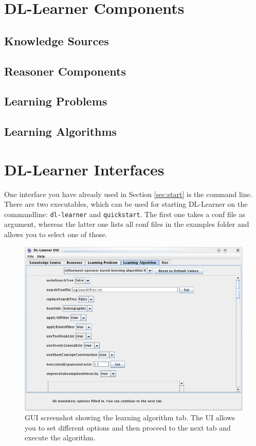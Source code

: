 \documentclass[a4paper,12pt]{scrartcl}
\begin{document}
\section{DL-Learner Components}
\label{sec:components}



\subsection{Knowledge Sources}

\subsection{Reasoner Components}

\subsection{Learning Problems}

\subsection{Learning Algorithms}



\section{DL-Learner Interfaces}

One interface you have already used in Section \ref{sec:start} is the command line. There are two executables, which can be used for starting DL-Learner on the commandline: \verb|dl-learner| and \verb|quickstart|. The first one takes a conf file as argument, whereas the latter one lists all conf files in the examples folder and allows you to select one of those.

\begin{figure}
 \centering
 \includegraphics[width=.9\textwidth]{../../resources/screenshots/gui_algorithm}
 \caption{GUI screenshot showing the learning algorithm tab. The UI allows you to set different options and then proceed to the next tab and execute the algorithm.}
 \label{fig:gui}
\end{figure}
\end{document}
